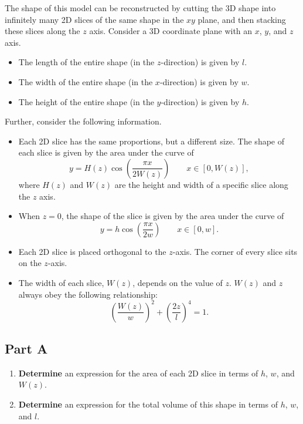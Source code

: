 \documentclass{exam}
\begin{document}
\noindent The shape of this model can be reconstructed by cutting the 3D shape into infinitely many 2D slices of the same shape in the $xy$ plane, and then stacking these slices along the $z$ axis. Consider a 3D coordinate plane with an $x$, $y$, and $z$ axis.
\begin{itemize}
    \item The length of the entire shape (in the $z$-direction) is given by $l$.
    \item The width of the entire shape (in the $x$-direction) is given by $w$.
    \item The height of the entire shape (in the $y$-direction) is given by $h$.
\end{itemize}
Further, consider the following information.
\begin{itemize}
    \item Each 2D slice has the same proportions, but a different size. The shape of each slice is given by the area under the curve of $$y=H(z)\cos \left(\frac{\pi x}{2 W(z)} \right) \qquad x \in [0,W(z)],$$ where $H(z)$ and $W(z)$ are the height and width of a specific slice along the $z$ axis.
    \item When $z=0$, the shape of the slice is given by the area under the curve of $$y=h\cos \left(\frac{\pi x}{2 w} \right) \qquad x \in [0,w].$$
    \item Each 2D slice is placed orthogonal to the $z$-axis. The corner of every slice sits on the $z$-axis.
    \item The width of each slice, $W(z)$, depends on the value of $z$. $W(z)$ and $z$ always obey the following relationship: $$\left(\frac{W(z)}{w}\right)^2+\left(\frac{2z}{l}\right)^4=1.$$
\end{itemize}

\subsection*{Part A}

\begin{enumerate}
    \item \textbf{Determine} an expression for the area of each 2D slice in terms of $h$, $w$, and $W(z)$.


    \item \textbf{Determine} an expression for the total volume of this shape in terms of $h$, $w$, and $l$.



    
\end{enumerate}
\end{document}
